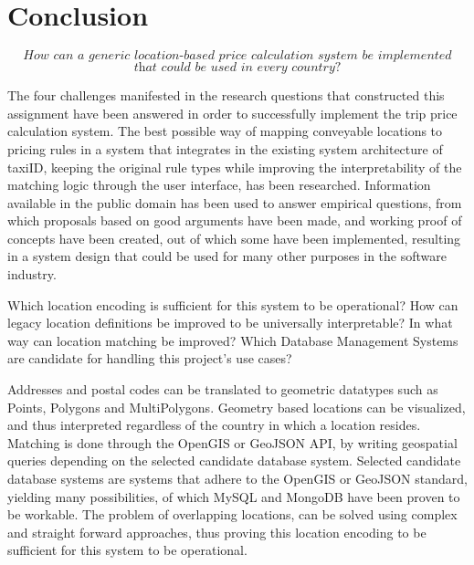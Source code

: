 \graphicspath{{Chapter7/Figs/Vector/}{Chapter7/Figs/}}

%
\chapter{Conclusion}
\[\textit{How can a generic location-based price calculation system be implemented}\]
\[\textit{that could be used in every country?}\] \hfill

The four challenges manifested in the research questions that constructed this assignment have been answered in order to successfully implement the trip price calculation system. The best possible way of mapping conveyable locations to pricing rules in a system that integrates in the existing system architecture of taxiID, keeping the original rule types while improving the interpretability of the matching logic through the user interface, has been researched. Information available in the public domain has been used to answer empirical questions, from which proposals based on good arguments have been made, and working proof of concepts have been created, out of which some have been implemented, resulting in a system design that could be used for many other purposes in the software industry.


Which location encoding is sufficient for this system to be operational?
How can legacy location definitions be improved to be universally interpretable?
In what way can location matching be improved?
Which Database Management Systems are candidate for handling this project's use cases?

Addresses and postal codes can be translated to geometric datatypes such as Points, Polygons and MultiPolygons. Geometry based locations can be visualized, and thus interpreted regardless of the country in which a location resides. Matching is done through the OpenGIS or GeoJSON API, by writing geospatial queries depending on the selected candidate database system. Selected candidate database systems are systems that adhere to the OpenGIS or GeoJSON standard, yielding many possibilities, of which MySQL and MongoDB have been proven to be workable. The problem of overlapping locations, can be solved using complex and straight forward approaches, thus proving this location encoding to be sufficient for this system to be operational.

